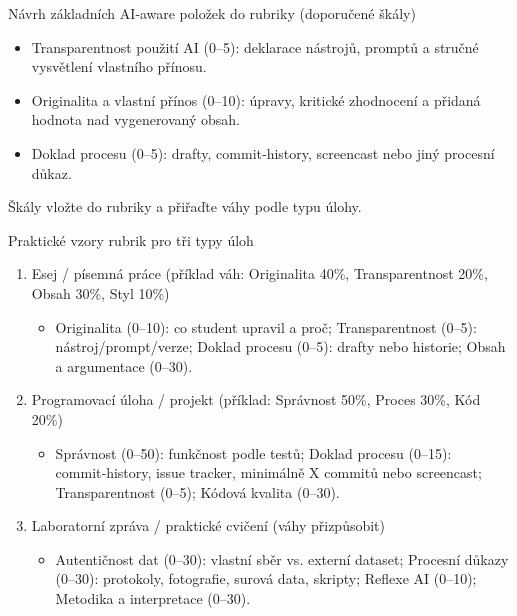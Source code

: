 \documentclass{report}%
\begin{document}
\medskip

Návrh základních AI‑aware položek do rubriky (doporučené škály)
\begin{itemize}
\item Transparentnost použití AI (0–5): deklarace nástrojů, promptů a stručné vysvětlení vlastního přínosu.
\item Originalita a vlastní přínos (0–10): úpravy, kritické zhodnocení a přidaná hodnota nad vygenerovaný obsah.
\item Doklad procesu (0–5): drafty, commit‑history, screencast nebo jiný procesní důkaz.
\end{itemize}

Škály vložte do rubriky a přiřaďte váhy podle typu úlohy.

\medskip

Praktické vzory rubrik pro tři typy úloh
\begin{enumerate}
\item Esej / písemná práce (příklad váh: Originalita 40\%, Transparentnost 20\%, Obsah 30\%, Styl 10\%)
  \begin{itemize}
  \item Originalita (0–10): co student upravil a proč; Transparentnost (0–5): nástroj/prompt/verze; Doklad procesu (0–5): drafty nebo historie; Obsah a argumentace (0–30).
  \end{itemize}

\item Programovací úloha / projekt (příklad: Správnost 50\%, Proces 30\%, Kód 20\%)
  \begin{itemize}
  \item Správnost (0–50): funkčnost podle testů; Doklad procesu (0–15): commit‑history, issue tracker, minimálně X commitů nebo screencast; Transparentnost (0–5); Kódová kvalita (0–30).
  \end{itemize}

\item Laboratorní zpráva / praktické cvičení (váhy přizpůsobit)
  \begin{itemize}
  \item Autentičnost dat (0–30): vlastní sběr vs. externí dataset; Procesní důkazy (0–30): protokoly, fotografie, surová data, skripty; Reflexe AI (0–10); Metodika a interpretace (0–30).
  \end{itemize}
\end{enumerate}
\end{document}
